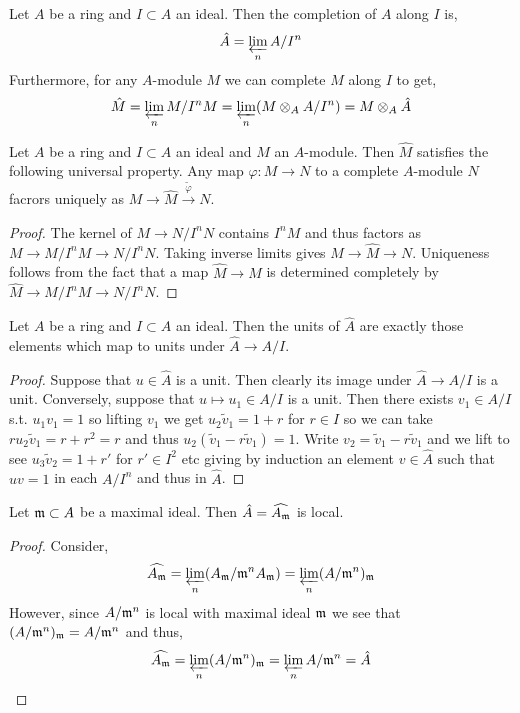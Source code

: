\documentclass[12pt]{article}
\begin{document}
\begin{defn}
Let $A$ be a ring and $I \subset A$ an ideal. Then the completion of $A$ along $I$ is,
\[ \hat{A} = \varprojlim_{n} A / I^n \]
Furthermore, for any $A$-module $M$ we can complete $M$ along $I$ to get,
\[ \hat{M} = \varprojlim_{n} M / I^n M = \varprojlim_{n}( M \otimes_A A / I^n) = M \otimes_A \hat{A} \]
\end{defn}

\begin{prop}
Let $A$ be a ring and $I \subset A$ an ideal and $M$ an $A$-module. Then $\hat{M}$ satisfies the following universal property. Any map $\varphi : M \to N$ to a complete $A$-module $N$ facrors uniquely as $M \to \hat{M} \xrightarrow{\tilde{\varphi}} N$. 
\end{prop}

\begin{proof}
The kernel of $M \to N/I^n N$ contains $I^n M$ and thus factors as $M \to M / I^n M \to N / I^n N$. Taking inverse limits gives $M \to \hat{M} \to N$. Uniqueness follows from the fact that a map $\hat{M} \to M$ is determined completely by $\hat{M} \to M / I^n M \to N / I^n N$. 
\end{proof}

\begin{lemma}
Let $A$ be a ring and $I \subset A$ an ideal. Then the units of $\hat{A}$ are exactly those elements which map to units under $\hat{A} \to A / I$.
\end{lemma}

\begin{proof}
Suppose that $u \in \hat{A}$ is a unit. Then clearly its image under $\hat{A} \to A / I$ is a unit. Conversely, suppose that $u \mapsto u_1 \in A / I$ is a unit. Then there exists $v_1 \in A/I$ s.t. $u_1 v_1 = 1$ so lifting $v_1$ we get $u_2 \tilde{v}_1 = 1 + r$ for $r \in I$ so we can take $r u_2 \tilde{v}_1 = r + r^2 = r$ and thus $u_2 (\tilde{v}_1 - r \tilde{v}_1) = 1$. Write $v_2 = \tilde{v}_1 - r \tilde{v}_1$ and we lift to see $u_3 \tilde{v}_2 = 1 + r'$ for $r' \in I^2$ etc giving by induction an element $v \in \hat{A}$ such that $u v = 1$ in each $A / I^n$ and thus in $\hat{A}$.
\end{proof}

\begin{lemma}
Let $\mathfrak{m} \subset A$ be a maximal ideal. Then $\hat{A} = \widehat{A_{\mathfrak{m}}}$ is local.
\end{lemma}

\begin{proof}
Consider,
\[ \widehat{A_{\mathfrak{m}}} = \varprojlim_{n} (A_{\mathfrak{m}} / \mathfrak{m}^n A_{\mathfrak{m}}) = \varprojlim_{n} (A / \mathfrak{m}^n)_{\mathfrak{m}} \]
However, since $A / \mathfrak{m}^n$ is local with maximal ideal $\mathfrak{m}$ we see that $(A / \mathfrak{m}^n)_{\mathfrak{m}} = A / \mathfrak{m}^n$ and thus,
\[ \widehat{A_{\mathfrak{m}}} = \varprojlim_{n} (A / \mathfrak{m}^n)_{\mathfrak{m}} = \varprojlim_{n} A / \mathfrak{m}^n = \hat{A} \]
\end{proof}
\end{document}
